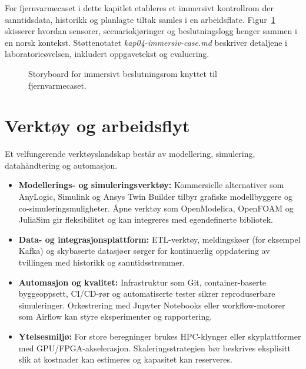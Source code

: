 For fjernvarmecaset i dette kapitlet etableres et immersivt kontrollrom der sanntidsdata, historikk og planlagte tiltak samles i en arbeidsflate. Figur~\ref{fig:kap04-immersiv-beslutning} skisserer hvordan sensorer, scenariokjøringer og beslutningslogg henger sammen i en norsk kontekst. Støttenotatet \textit{kap04-immersiv-case.md} beskriver detaljene i laboratorieøvelsen, inkludert oppgavetekst og evaluering.

\begin{figure}[htbp]
    \centering
    \caption{Storyboard for immersivt beslutningsrom knyttet til fjernvarmecaset.}
    \label{fig:kap04-immersiv-beslutning}
\end{figure}

\section{Verktøy og arbeidsflyt}
Et velfungerende verktøyslandskap består av modellering, simulering, datahåndtering og automasjon.

\begin{itemize}
    \item \textbf{Modellerings- og simuleringsverktøy:} Kommersielle alternativer som AnyLogic, Simulink og Ansys Twin Builder tilbyr grafiske modellbyggere og co-simuleringsmuligheter. Åpne verktøy som OpenModelica, OpenFOAM og JuliaSim gir fleksibilitet og kan integreres med egendefinerte bibliotek.
    \item \textbf{Data- og integrasjonsplattform:} ETL-verktøy, meldingskøer (for eksempel Kafka) og skybaserte datasjøer sørger for kontinuerlig oppdatering av tvillingen med historikk og sanntidsstrømmer.
    \item \textbf{Automasjon og kvalitet:} Infrastruktur som Git, container-baserte byggeoppsett, CI/CD-rør og automatiserte tester sikrer reproduserbare simuleringer. Orkestrering med Jupyter Notebooks eller workflow-motorer som Airflow kan styre eksperimenter og rapportering.
    \item \textbf{Ytelsesmiljø:} For store beregninger brukes HPC-klynger eller skyplattformer med GPU/FPGA-akselerasjon. Skaleringsstrategien bør beskrives eksplisitt slik at kostnader kan estimeres og kapasitet kan reserveres.
\end{itemize}

